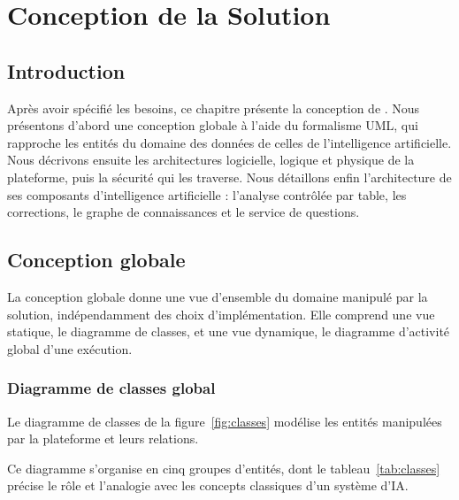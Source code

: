 \chapter{Conception de la Solution}

\section*{Introduction}
Après avoir spécifié les besoins, ce chapitre présente la conception de \projet{}. Nous présentons d'abord une conception globale à l'aide du formalisme UML, qui rapproche les entités du domaine des données de celles de l'intelligence artificielle. Nous décrivons ensuite les architectures logicielle, logique et physique de la plateforme, puis la sécurité qui les traverse. Nous détaillons enfin l'architecture de ses composants d'intelligence artificielle : l'analyse contrôlée par table, les corrections, le graphe de connaissances et le service de questions.

\section{Conception globale}

La conception globale donne une vue d'ensemble du domaine manipulé par la solution, indépendamment des choix d'implémentation. Elle comprend une vue statique, le diagramme de classes, et une vue dynamique, le diagramme d'activité global d'une exécution.

\subsection{Diagramme de classes global}

Le diagramme de classes de la figure~\ref{fig:classes} modélise les entités manipulées par la plateforme et leurs relations.


Ce diagramme s'organise en cinq groupes d'entités, dont le tableau~\ref{tab:classes} précise le rôle et l'analogie avec les concepts classiques d'un système d'IA.

